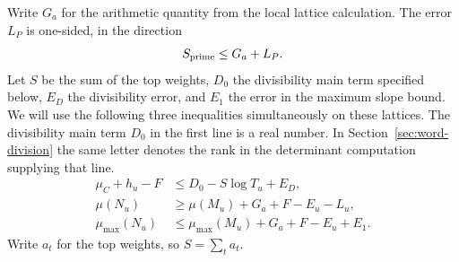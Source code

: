 Write \(G_a\) for the arithmetic quantity from the local lattice calculation. The error \(L_P\) is one-sided, in the direction
\[
 S_{\rm prime}\le G_a+L_P .
\]
Let \(S\) be the sum of the top weights, \(D_0\) the
divisibility main term specified below, \(E_D\) the
divisibility error, and \(E_1\) the error in the maximum
slope bound. We will use the following three inequalities simultaneously on these lattices.
The divisibility main term \(D_0\) in the first line is a real number.
In Section~\ref{sec:word-division} the same letter denotes the rank
in the determinant computation supplying that line.
\begin{align}
 \mu_C+h_u-F&\le D_0-S\log T_u+E_D,\label{eq:division-slopes}\\
 \mu(N_u)&\ge\mu(M_u)+G_a+F-E_u-L_u,\label{eq:lower-slopes}\\
 \mu_{\max}(N_u)&\le\mu_{\max}(M_u)+G_a+F-E_u+E_1.
 \label{eq:upper-slopes}
\end{align}
Write \(a_t\) for the top weights, so \(S=\sum_t a_t\).

